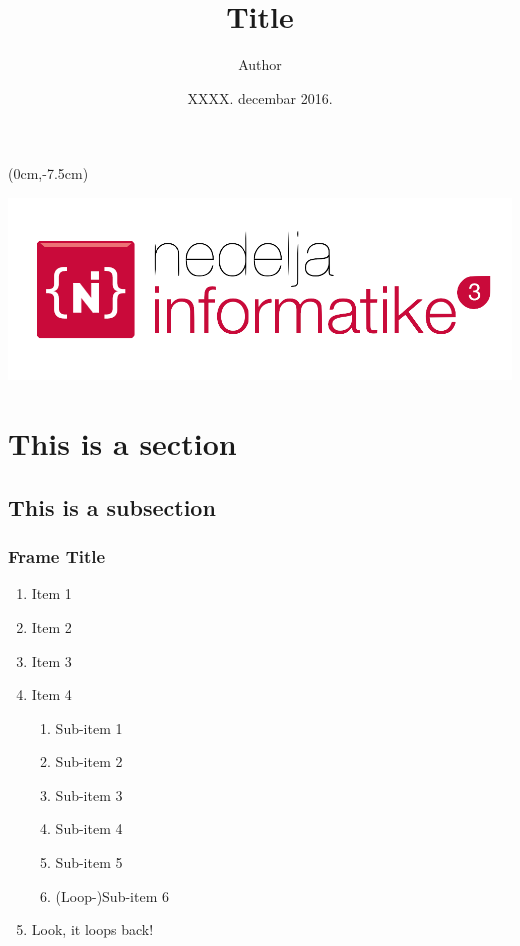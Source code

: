 \documentclass[11pt, compress]{beamer}
\title{Title}
\author[\textcolor{lgry}{Author}]{Author}
\date{XXXX. decembar 2016.}
\institute{Matematička gimnazija\\ \textcolor{uorange}{\scshape Nedelja informatike$^3$}}
\begin{document}
{
    \begin{frame}
        \titlepage
        \begin{textblock*}{\linewidth}(0cm,-7.5cm)
  		\begin{center}
        \includegraphics[width=0.4\linewidth]{v3-logo.png}
        \end{center}
        \end{textblock*}
    \end{frame}
}

\section{This is a section}

\subsection{This is a subsection}

\begin{frame}
    \frametitle{Frame Title}
    
	\begin{enumerate}
		\item Item 1
		\vfill
		\item Item 2
		\vfill
		\item Item 3
		\vfill
		\item Item 4
		\begin{enumerate}	
			\item Sub-item 1
			\item Sub-item 2
			\item Sub-item 3
			\item Sub-item 4
			\item Sub-item 5
			\item (Loop-)Sub-item 6
		\end{enumerate}
		\vfill
		\item Look, it loops back!
	\end{enumerate}
\end{frame}
\end{document}
